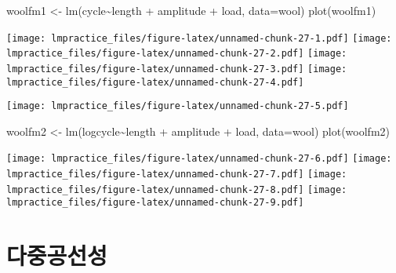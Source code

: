 \documentclass[
]{book}
\newenvironment{Shaded}{\begin{snugshade}}{\end{snugshade}}
\newcommand{\AttributeTok}[1]{\textcolor[rgb]{0.77,0.63,0.00}{#1}}
\newcommand{\FunctionTok}[1]{\textcolor[rgb]{0.00,0.00,0.00}{#1}}
\newcommand{\NormalTok}[1]{#1}
\newcommand{\OtherTok}[1]{\textcolor[rgb]{0.56,0.35,0.01}{#1}}
\newcommand{\SpecialCharTok}[1]{\textcolor[rgb]{0.00,0.00,0.00}{#1}}
\begin{document}
\begin{Shaded}
\begin{Highlighting}[]
\NormalTok{woolfm1 }\OtherTok{\textless{}{-}} \FunctionTok{lm}\NormalTok{(cycle}\SpecialCharTok{\textasciitilde{}}\NormalTok{length }\SpecialCharTok{+}\NormalTok{ amplitude }\SpecialCharTok{+}\NormalTok{ load, }\AttributeTok{data=}\NormalTok{wool)}
\FunctionTok{plot}\NormalTok{(woolfm1)}
\end{Highlighting}
\end{Shaded}

\texttt{[image: lmpractice\_files/figure-latex/unnamed-chunk-27-1.pdf]} \texttt{[image: lmpractice\_files/figure-latex/unnamed-chunk-27-2.pdf]} \texttt{[image: lmpractice\_files/figure-latex/unnamed-chunk-27-3.pdf]} \texttt{[image: lmpractice\_files/figure-latex/unnamed-chunk-27-4.pdf]}

\begin{Shaded}
\end{Shaded}

\texttt{[image: lmpractice\_files/figure-latex/unnamed-chunk-27-5.pdf]}

\begin{Shaded}
\begin{Highlighting}[]
\NormalTok{woolfm2 }\OtherTok{\textless{}{-}} \FunctionTok{lm}\NormalTok{(logcycle}\SpecialCharTok{\textasciitilde{}}\NormalTok{length }\SpecialCharTok{+}\NormalTok{ amplitude }\SpecialCharTok{+}\NormalTok{ load, }\AttributeTok{data=}\NormalTok{wool)}
\FunctionTok{plot}\NormalTok{(woolfm2)}
\end{Highlighting}
\end{Shaded}

\texttt{[image: lmpractice\_files/figure-latex/unnamed-chunk-27-6.pdf]} \texttt{[image: lmpractice\_files/figure-latex/unnamed-chunk-27-7.pdf]} \texttt{[image: lmpractice\_files/figure-latex/unnamed-chunk-27-8.pdf]} \texttt{[image: lmpractice\_files/figure-latex/unnamed-chunk-27-9.pdf]}

\hypertarget{uxb2e4uxc911uxacf5uxc120uxc131}{%
\section{다중공선성}\label{uxb2e4uxc911uxacf5uxc120uxc131}}
\end{document}
